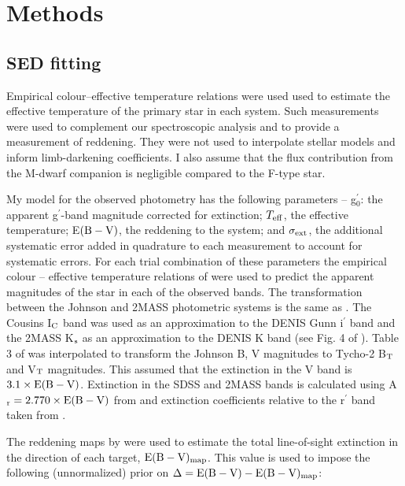 \chapter{Methods}

\section{SED fitting}\label{methods:SED}

Empirical colour--effective temperature relations were used used to estimate the effective temperature of the primary star in each system. Such measurements were used to complement our spectroscopic analysis and to provide a measurement of reddening. They were not used to interpolate stellar models and inform limb-darkening coefficients. I also assume that the flux contribution from the M-dwarf companion is negligible compared to the F-type star.

 My model for the observed photometry has the following parameters -- g$^{\prime}_{0}$: the apparent g$^{\prime}$-band magnitude corrected for extinction; $T_{\rm eff}$, the effective temperature; E$({\rm B}-{\rm V})$, the reddening to the system; and $\sigma_{\rm ext}$, the additional systematic error added in quadrature to each measurement to account for systematic errors. For each trial combination of these parameters the empirical colour -- effective temperature relations of \cite{2013ApJ...771...40B} were used to predict the apparent magnitudes of the  star in each of the observed bands. The transformation between the Johnson and 2MASS photometric systems is the same as \citet{2013ApJ...771...40B}. The  Cousins I$_{\rm C}$ band was used as an approximation to the DENIS Gunn i$^{\prime}$ band and the 2MASS K$_{\rm s}$  as an approximation to the DENIS K band (see Fig. 4 of \citealt{2005ARA26A..43..293B}). Table 3 of \citet{2000PASP..112..961B} was interpolated to transform the Johnson B, V magnitudes to Tycho-2 B$_{\rm T}$ and V$_{\rm T}$ magnitudes. This assumed that the extinction in the V band is $3.1\times {\rm E}({\rm B}-{\rm V})$. Extinction in the SDSS and 2MASS bands is calculated using A$_{\rm r} = 2.770\times {\rm E}({\rm B}-{\rm V})$ from \citet{2003A26A...401..781F} and extinction coefficients relative to the r$^{\prime}$ band taken from \citet{2014MNRAS.440.3430D}.

The reddening maps by \citet{2011ApJ...737..103S} were used to estimate the total line-of-sight extinction in the direction of each target, ${\rm E}({\rm B}-{\rm V})_{\rm map}$. This value is used to impose the following (unnormalized) prior on $\Delta = {\rm E}({\rm B}-{\rm V}) - {\rm E}({\rm B}-{\rm V})_{\rm map}$:

